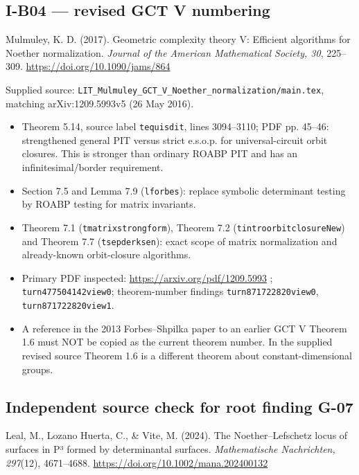 \documentclass[11pt,a4paper]{article}
\providecommand{\tightlist}{\setlength{\itemsep}{0pt}\setlength{\parskip}{0pt}}
\theoremstyle{definition}\newtheorem{definition}{Definition}
\begin{document}
\subsection{I-B04 --- revised GCT V
numbering}\label{i-b04--revised-gct-v-numbering}

Mulmuley, K. D. (2017). Geometric complexity theory V: Efficient
algorithms for Noether normalization. \emph{Journal of the American
Mathematical Society, 30}, 225--309.
\url{https://doi.org/10.1090/jams/864}

Supplied source:
\texttt{LIT\_Mulmuley\_GCT\_V\_Noether\_normalization/main.tex},
matching arXiv:1209.5993v5 (26 May 2016).

\begin{itemize}
\tightlist
\item
  Theorem 5.14, source label \texttt{tequisdit}, lines 3094--3110; PDF
  pp. 45--46: strengthened general PIT versus strict e.s.o.p. for
  universal-circuit orbit closures. This is stronger than ordinary ROABP
  PIT and has an infinitesimal/border requirement.
\item
  Section 7.5 and Lemma 7.9 (\texttt{lforbes}): replace symbolic
  determinant testing by ROABP testing for matrix invariants.
\item
  Theorem 7.1 (\texttt{tmatrixstrongform}), Theorem 7.2
  (\texttt{tintroorbitclosureNew}) and Theorem 7.7
  (\texttt{tsepderksen}): exact scope of matrix normalization and
  already-known orbit-closure algorithms.
\item
  Primary PDF inspected: \url{https://arxiv.org/pdf/1209.5993} ;
  \texttt{turn477504142view0}; theorem-number findings
  \texttt{turn871722820view0}, \texttt{turn871722820view1}.
\item
  A reference in the 2013 Forbes--Shpilka paper to an earlier GCT V
  Theorem 1.6 must NOT be copied as the current theorem number. In the
  supplied revised source Theorem 1.6 is a different theorem about
  constant-dimensional groups.
\end{itemize}

\subsection{Independent source check for root finding
G-07}\label{independent-source-check-for-root-finding-g-07}

Leal, M., Lozano Huerta, C., \& Vite, M. (2024). The Noether--Lefschetz
locus of surfaces in P³ formed by determinantal surfaces.
\emph{Mathematische Nachrichten, 297}(12), 4671--4688.
\url{https://doi.org/10.1002/mana.202400132}
\end{document}
